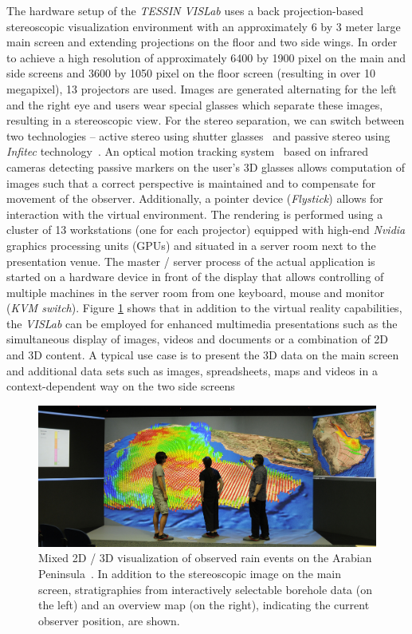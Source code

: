 \documentclass[twocolumn]{svjour3}          %
\begin{document}
The hardware setup of the \emph{TESSIN VISLab} uses a back projection-based stereoscopic visualization environment with an approximately 6 by 3 meter large main screen and extending projections on the floor and two side wings. In order to achieve a high resolution of approximately 6400 by 1900 pixel on the main and side screens and 3600 by 1050 pixel on the floor screen (resulting in over 10 megapixel), 13 projectors are used. Images are generated alternating for the left and the right eye and users wear special glasses which separate these images, resulting in a stereoscopic view. For the stereo separation, we can switch between two technologies -- active stereo using shutter glasses~\cite{activestereo} and passive stereo using \emph{Infitec} technology~\cite{infitec}. An optical motion tracking system~\cite{tracking} based on infrared cameras detecting passive markers on the user's 3D glasses allows computation of images such that a correct perspective is maintained and to compensate for movement of the observer. Additionally, a pointer device (\emph{Flystick}) allows for interaction with the virtual environment. The rendering is performed using a cluster of 13 workstations (one for each projector) equipped with high-end \emph{Nvidia} graphics processing units (GPUs) and situated in a server room next to the presentation venue. The master / server process of the actual application is started on a hardware device in front of the display that allows controlling of multiple machines in the server room from one keyboard, mouse and monitor (\emph{KVM switch}). Figure \ref{fig:sa}  shows that in addition to the virtual reality capabilities, the \emph{VISLab} can be employed for enhanced multimedia presentations such as the simultaneous display of images, videos and documents or a combination of 2D and 3D content. A typical use case is to present the 3D data on the main screen and additional data sets such as images, spreadsheets, maps and videos in a context-dependent way on the two side screens~\cite{zehner:2d3d}

\begin{figure}
  \includegraphics[width=1.0\textwidth]{images/sa_2d_3d.jpg}
\caption{Mixed 2D / 3D visualization of observed rain events on the Arabian Peninsula~\cite{rink:iwas}. In addition to the stereoscopic image on the main screen, stratigraphies from interactively selectable borehole data (on the left) and an overview map (on the right), indicating the current observer position, are shown.}
\label{fig:sa}
\end{figure}
\end{document}
